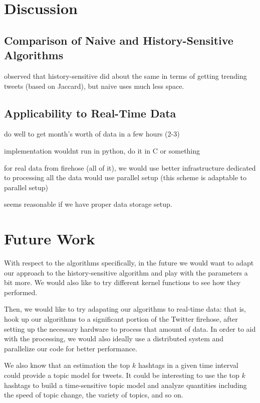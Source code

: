\documentclass[twoside]{article}
\begin{document}

\section{Discussion}

\subsection{Comparison of Naive and History-Sensitive Algorithms}

observed that history-sensitive 
did about the same in terms of getting trending tweets (based on Jaccard), 
but naive uses much less space. 

\subsection{Applicability to Real-Time Data}

do well to get month's worth of data in a few hours (2-3)

implementation wouldnt run in python, do it in C or something

for real data from firehose (all of it), we would use 
better infrastructure dedicated to processing all the data
would use parallel setup (this scheme is adaptable to parallel
setup)

seems reasonable if we have proper data storage setup.


\section{Future Work} \label{sec:Future Work}

With respect to the algorithms specifically, in the future we would want to adapt our approach to the history-sensitive algorithm and play with the parameters a bit more. We would also like to try different kernel functions to see how they performed. 

Then, we would like to try adapating our algorithms to real-time data: that is, hook up our algorithms to a significant portion of the Twitter firehose, after setting up the necessary hardware to process that amount of data. In order to aid with the processing, we would also ideally use a distributed system and parallelize
our code for better performance.

We also know that an estimation the top $k$ hashtags in a given time interval could provide a topic model for tweets. It could be interesting to use the top $k$ hashtags to build a time-sensitive topic model and analyze quantities including the speed of topic change, the variety of topics, and so on.
\end{document}
